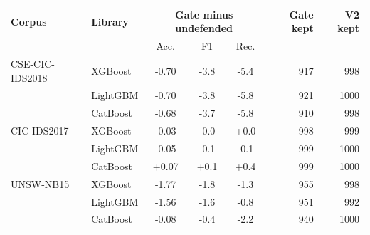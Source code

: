 \begin{tabular}{@{}llcccrr@{}}
\toprule
\textbf{Corpus} & \textbf{Library} & \multicolumn{3}{c}{\textbf{Gate minus undefended}} & \textbf{Gate kept} & \textbf{V2 kept} \\
& & Acc. & F1 & Rec. & & \\
\midrule
CSE-CIC-IDS2018 & XGBoost & -0.70 & -3.8 & -5.4 & 917 & 998 \\
 & LightGBM & -0.70 & -3.8 & -5.8 & 921 & 1000 \\
 & CatBoost & -0.68 & -3.7 & -5.8 & 910 & 998 \\
\midrule
CIC-IDS2017 & XGBoost & -0.03 & -0.0 & +0.0 & 998 & 999 \\
 & LightGBM & -0.05 & -0.1 & -0.1 & 999 & 1000 \\
 & CatBoost & +0.07 & +0.1 & +0.4 & 999 & 1000 \\
\midrule
UNSW-NB15 & XGBoost & -1.77 & -1.8 & -1.3 & 955 & 998 \\
 & LightGBM & -1.56 & -1.6 & -0.8 & 951 & 992 \\
 & CatBoost & -0.08 & -0.4 & -2.2 & 940 & 1000 \\
\bottomrule
\end{tabular}
